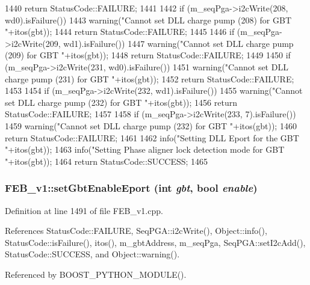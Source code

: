 \begin{DoxyCode}
{{1440     return StatusCode::FAILURE;
1441   }
1442   if (m_seqPga->i2cWrite(208, wd0).isFailure()){
1443     warning("Cannot set DLL charge pump (208) for GBT "+itos(gbt));
1444     return StatusCode::FAILURE;
1445   }
1446   if (m_seqPga->i2cWrite(209, wd1).isFailure()){
1447     warning("Cannot set DLL charge pump (209) for GBT "+itos(gbt));
1448     return StatusCode::FAILURE;
1449   }
1450   if (m_seqPga->i2cWrite(231, wd0).isFailure()){
1451     warning("Cannot set DLL charge pump (231) for GBT "+itos(gbt));
1452     return StatusCode::FAILURE;
1453   }
1454   if (m_seqPga->i2cWrite(232, wd1).isFailure()){
1455     warning("Cannot set DLL charge pump (232) for GBT "+itos(gbt));
1456     return StatusCode::FAILURE;
1457   }
1458   if (m_seqPga->i2cWrite(233, 7).isFailure()){
1459     warning("Cannot set DLL charge pump (232) for GBT "+itos(gbt));
1460     return StatusCode::FAILURE;
1461   }
1462   info("Setting DLL Eport for the GBT "+itos(gbt));
1463   info("Setting Phase aligner lock detection mode for GBT "+itos(gbt));
1464   return StatusCode::SUCCESS;
1465 }
\end{DoxyCode}
\hypertarget{classFEB__v1_a30ce0e679748a4e2bf7f953b2162618f}{
\subsubsection[{setGbtEnableEport}]{ FEB\_\-v1::setGbtEnableEport (int {\em gbt}, \/  bool {\em enable})}}
\label{classFEB__v1_a30ce0e679748a4e2bf7f953b2162618f}


Definition at line 1491 of file FEB\_\-v1.cpp.

References StatusCode::FAILURE, SeqPGA::i2cWrite(), Object::info(), StatusCode::isFailure(), itos(), m\_\-gbtAddress, m\_\-seqPga, SeqPGA::setI2cAdd(), StatusCode::SUCCESS, and Object::warning().

Referenced by BOOST\_\-PYTHON\_\-MODULE().


